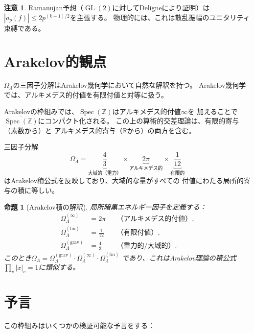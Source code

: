 \documentclass[12pt,a4paper]{article}
\newtheorem{proposition}[theorem]{命題}
\theoremstyle{definition}
\newtheorem{remark}[theorem]{注意}
\newcommand{\Spec}{\operatorname{Spec}}
\newcommand{\GL}{\operatorname{GL}}
\newcommand{\Z}{\mathbb{Z}}
\newcommand{\R}{\mathbb{R}}
\newcommand{\OmL}{\Omega_\Lambda}
\begin{document}
\begin{remark}
Ramanujan予想（$\GL(2)$に対してDeligneにより証明）は
$|a_p(f)| \le 2p^{(k-1)/2}$を主張する。
物理的には、これは散乱振幅のユニタリティ束縛である。
\end{remark}

\section{Arakelov的観点}\label{sec:arakelov}

$\OmL$の三因子分解はArakelov幾何学において自然な解釈を持つ。
Arakelov幾何学では、アルキメデス的付値を有限付値と対等に扱う。

Arakelovの枠組みでは、$\Spec(\Z)$はアルキメデス的付値$\infty$を
加えることで$\overline{\Spec(\Z)}$にコンパクト化される。
この上の算術的交差理論は、有限的寄与（素数から）と
アルキメデス的寄与（$\R$から）の両方を含む。

三因子分解
\[
  \OmL = \underbrace{\frac{4}{3}}_{\text{大域的（重力）}}
       \times\underbrace{2\pi}_{\text{アルキメデス的}}
       \times\underbrace{\frac{1}{12}}_{\text{有限的}}
\]
はArakelov積公式を反映しており、大域的な量がすべての
付値にわたる局所的寄与の積に等しい。

\begin{proposition}[Arakelov積の解釈]
局所暗黒エネルギー因子を定義する：
\begin{align}
  \OmL^{(\infty)} &= 2\pi & &\text{（アルキメデス的付値）}, \\
  \OmL^{(\text{fin})} &= \frac{1}{12} & &\text{（有限付値）}, \\
  \OmL^{(\text{grav})} &= \frac{4}{3} & &\text{（重力的/大域的）}.
\end{align}
このとき$\OmL = \OmL^{(\text{grav})}\cdot\OmL^{(\infty)}\cdot\OmL^{(\text{fin})}$
であり、これはArakelov理論の積公式
$\prod_v |x|_v = 1$に類似する。
\end{proposition}

\section{予言}\label{sec:predictions}

この枠組みはいくつかの検証可能な予言をする：
\end{document}

